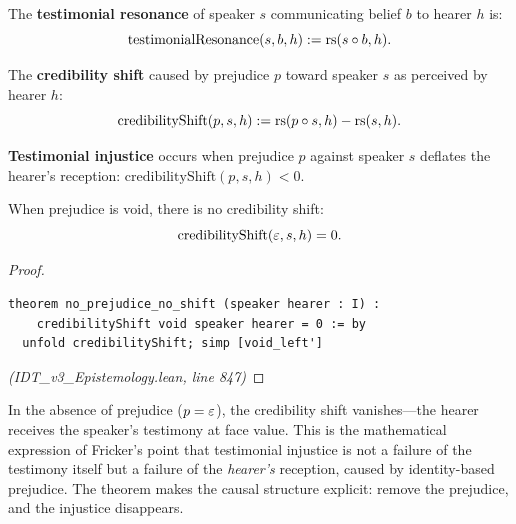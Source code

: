 \begin{definition}
\label{def:testimonial-resonance}
The \textbf{testimonial resonance} of speaker $s$ communicating belief $b$
to hearer $h$ is:
\[
  \mathrm{testimonialResonance}(s, b, h) := \mathrm{rs}(s \circ b, h).
\]
\end{definition}

\begin{definition}
\label{def:credibility-shift}
The \textbf{credibility shift} caused by prejudice $p$ toward speaker $s$ as
perceived by hearer $h$:
\[
  \mathrm{credibilityShift}(p, s, h) := \mathrm{rs}(p \circ s, h) - \mathrm{rs}(s, h).
\]
\end{definition}

\begin{definition}
\label{def:testimonial-injustice}
\textbf{Testimonial injustice} occurs when prejudice $p$ against speaker $s$
deflates the hearer's reception: $\mathrm{credibilityShift}(p, s, h) < 0$.
\end{definition}

\begin{theorem}
\label{thm:no-prejudice}
When prejudice is void, there is no credibility shift:
\[
  \mathrm{credibilityShift}(\varepsilon, s, h) = 0.
\]
\end{theorem}

\begin{proof}
\begin{lstlisting}
theorem no_prejudice_no_shift (speaker hearer : I) :
    credibilityShift void speaker hearer = 0 := by
  unfold credibilityShift; simp [void_left']
\end{lstlisting}
\textit{(IDT\_v3\_Epistemology.lean, line 847)}
\end{proof}

\begin{interpretation}
In the absence of prejudice ($p = \varepsilon$), the credibility shift vanishes---the
hearer receives the speaker's testimony at face value. This is the mathematical
expression of Fricker's point that testimonial injustice is not a failure of
the testimony itself but a failure of the \emph{hearer's} reception, caused by
identity-based prejudice. The theorem makes the causal structure explicit:
remove the prejudice, and the injustice disappears.
\end{interpretation}

